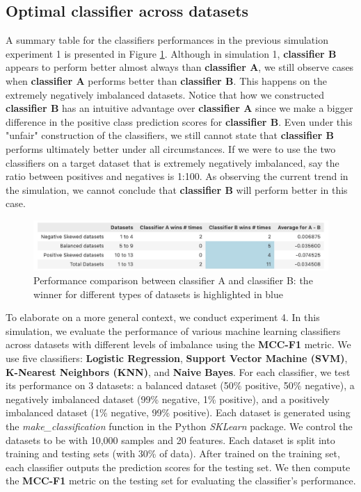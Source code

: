 \documentclass[12pt, oneside]{amsart}
\theoremstyle{definition}
\theoremstyle{remark}
\numberwithin{equation}{section}
\begin{document}
\subsection{Optimal classifier across datasets}
A summary table for the classifiers performances in the previous simulation experiment 1 is presented in Figure \ref{simulation1_table}. Although in simulation 1, \textbf{classifier B} appears to perform better almost always than \textbf{classifier A}, we still observe cases when \textbf{classifier A} performs better than \textbf{classifier B}. This happens on the extremely negatively imbalanced datasets. Notice that how we constructed \textbf{classifier B} has an intuitive advantage over \textbf{classifier A} since we make a bigger difference in the positive class prediction scores for \textbf{classifier B}. Even under this "unfair" construction of the classifiers, we still cannot state that \textbf{classifier B} performs ultimately better under all circumstances. If we were to use the two classifiers on a target dataset that is extremely negatively imbalanced, say the ratio between positives and negatives is 1:100. As observing the current trend in the simulation, we cannot conclude that \textbf{classifier B} will perform better in this case. 

\begin{figure}[hbt!]
    \centering
    \includegraphics[scale=0.3]{Report/Figure/simulation1_table.jpg}
    \caption{Performance comparison between classifier A and classifier B: the winner for different types of datasets is highlighted in blue}
    \label{simulation1_table}
\end{figure}
\FloatBarrier

To elaborate on a more general context, we conduct experiment 4. In this simulation, we evaluate the performance of various machine learning classifiers across datasets with different levels of imbalance using the \textbf{MCC-F1} metric. We use five classifiers: \textbf{Logistic Regression}, \textbf{Support Vector Machine (SVM)}, \textbf{K-Nearest Neighbors (KNN)}, and \textbf{Naive Bayes}. For each classifier, we test its performance on 3 datasets: a balanced dataset (50\% positive, 50\% negative), a negatively imbalanced dataset (99\% negative, 1\% positive), and a positively imbalanced dataset (1\% negative, 99\% positive). Each dataset is generated using the \textit{make\_classification} function in the Python \textit{SKLearn} package. We control the datasets to be with 10,000 samples and 20 features. Each dataset is split into training and testing sets (with 30\% of data). After trained on the training set, each classifier outputs the prediction scores for the testing set. We then compute the \textbf{MCC-F1} metric on the testing set for evaluating the classifier's performance.\\
\end{document}
